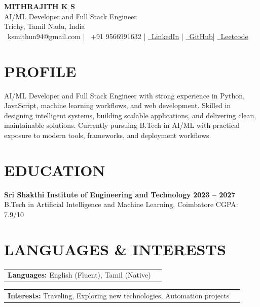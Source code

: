 \documentclass[a4paper,11pt]{article}
\newcommand{\educationHeading}[4]{
  \textbf{#1} \hfill \textbf{#2}\\[-2pt]
  {\small #3} \hfill {\small #4}
}
\begin{document}
\begin{center}
{\Huge\bfseries\textcolor{headerblue}{MITHRAJITH K S}}\\[4pt]
AI/ML Developer and Full Stack Engineer \\[6pt]
 Trichy, Tamil Nadu, India \\[4pt]
\faEnvelope\  ksmithun94@gmail.com \quad|\quad
\faPhone\  +91 9566991632 \quad|\quad
\href{https://linkedin.com/in/mithrajitks046}{\faLinkedin\ LinkedIn} \quad|\quad
\href{https://github.com/mithrajith46}{\faGithub\ GitHub}\quad|\quad
\href{https://leetcode.com/u/ZWZeOu9Z50/}{\faLinkedin\ Leetcode}
\end{center}

\vspace{8pt}

\section{PROFILE}
\small{
AI/ML Developer and Full Stack Engineer with strong experience in Python, JavaScript, machine learning workflows, and web development. Skilled in designing intelligent systems, building scalable applications, and delivering clean, maintainable solutions. Currently pursuing B.Tech in AI/ML with practical exposure to modern tools, frameworks, and deployment workflows.
}

\vspace{6pt}

\section{EDUCATION}
\educationHeading
{Sri Shakthi Institute of Engineering and Technology}
{2023 -- 2027}
{B.Tech in Artificial Intelligence and Machine Learning, Coimbatore}
{CGPA: 7.9/10}

\vspace{6pt}


\section*{LANGUAGES \& INTERESTS}
\begin{tabularx}{\textwidth}{@{}X X@{}}

\textbf{Languages:} English (Fluent), Tamil (Native)  
\end{tabularx}
\begin{tabularx}{\textwidth}{@{}X X@{}}

\textbf{Interests:} Traveling, Exploring new technologies, Automation projects

\end{tabularx}
\end{document}
